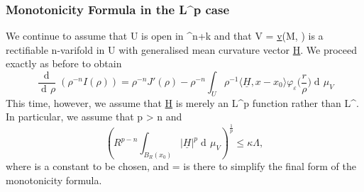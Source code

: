 \documentclass[a4paper, 11pt]{article}
\theoremstyle{plain}
\theoremstyle{definition}
\theoremstyle{remark}
\DeclareMathOperator{\diff}{d \!}
\numberwithin{equation}{subsection}
\def\({}
\def\){}
\begin{document}
\subsubsection{Monotonicity Formula in the \texorpdfstring{\(L^p\)}{Lp} case}

We continue to assume that \(U\) is open in \(^{n+k}\) and that \(V = \underline{v}(M, \theta)\) is a rectifiable \(n\)-varifold in \(U\) with generalised mean curvature vector \(\underline{H}\). We proceed exactly as before to obtain
\begin{equation}
\label{monotonicity_Lp_1}
\frac{\!\diff}{\diff\rho}(\rho^{-n}I(\rho)) = \rho^{-n}J'(\rho) - \rho^{-n}\int_{U}\rho^{-1} \langle \underline{H}, x - x_{0}\rangle \varphi_{\varepsilon}\bigg(\frac{r}{\rho}\bigg)\diff\mu_V
\end{equation}
This time, however, we assume that \(\underline{H}\) is merely an \(L^p\) function rather than \(L^{\infty}\). In particular, we assume that \(p > n\) and
\begin{equation}
\left(R^{p-n}\int_{B_R(x_0)}|\underline{H}|^p \diff\mu_V\right)^{\frac{1}{p}} \leqslant \kappa\Lambda,
\end{equation}
where \(\Lambda\) is a constant to be chosen, and \(\kappa = \) is there to simplify the final form of the monotonicity formula.
\end{document}
